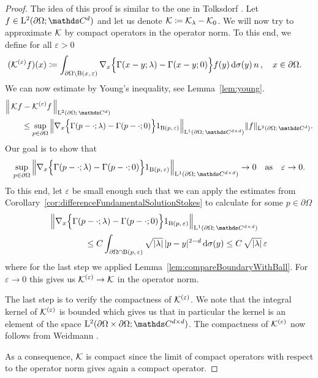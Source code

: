 \begin{proof}
  The idea of this proof is similar to the one in Tolksdorf \cite[Lem.\@~4.3.5]{tolksdorf}.
  Let $f \in \Ell^2(\partial\Omega; \C^d)$ and let us denote $\mathcal{K} \coloneqq \mathcal{K}_\lambda - \mathcal{K}_0$. 
  We will now try to approximate $\mathcal{K}$ by compact operators in the operator norm.
  To this end, we define for all $\varepsilon > 0$
  \begin{align*}
    &(\mathcal{K}^{(\varepsilon)}f)(x) 
    \coloneqq \int_{\partial\Omega \setminus \mathrm{B}(x,\,\varepsilon)} \nabla_x \Big\{ \Gamma(x - y; \lambda) - \Gamma(x - y; 0) \Big\} f(y) \, {\operatorname{d}\!{\sigma}}(y) \, n\,, \quad x \in \partial\Omega.
  \end{align*}
  We can now estimate by Young's inequality, see Lemma~\ref{lem:young}.
  \begin{align*}
    &\Big\| \,\K f - \K^{(\varepsilon)} f\, \Big\|_{\Ell^2(\partial\Omega; \,\C^d)} \\
    &\qquad\leq \sup_{p \in \partial\Omega} \Big\| \nabla_x \Big\{ \Gamma(p - \cdot; \lambda) - \Gamma(p - \cdot; 0) \Big\} 1_{\BB(p,\,\varepsilon)} \Big\|_{\Ell^1(\partial\Omega; \,\C^{d \times d})} \|f\|_{\Ell^2(\partial\Omega; \,\C^d)}.
  \end{align*}
  Our goal is to show that
  \begin{align*}
    \sup_{p \in \partial\Omega} \Big\| \nabla_x \Big\{ \Gamma(p - \cdot; \lambda) - \Gamma(p - \cdot; 0) \Big\} 1_{\BB(p,\,\varepsilon)} \Big\|_{\Ell^1(\partial\Omega; \,\C^{d \times d})} \to 0 \quad \text{as} \quad \varepsilon \to 0.
  \end{align*}
  To this end, let $\varepsilon$ be small enough such that we can apply the estimates from Corollary~\ref{cor:differenceFundamentalSolutionStokes} to calculate for some $p \in \partial\Omega$
  \begin{align*}
    &\Big\| \nabla_x \Big\{ \Gamma(p - \cdot; \lambda) - \Gamma(p - \cdot; 0) \Big\} 1_{\BB(p,\,\varepsilon)} \Big\|_{\Ell^1(\partial\Omega; \,\C^{d \times d})}  \\
     &\qquad\qquad\leq C \int_{\partial\Omega \cap \BB(p,\, \varepsilon)} \sqrt{|\lambda|}\, |p - y|^{2 - d} \d\sigma(y) 
     \leq C\, \sqrt{|\lambda|} \,\varepsilon
  \end{align*}
  where for the last step we applied Lemma~\ref{lem:compareBoundaryWithBall}.
  For $\varepsilon \to 0$ this gives us $\mathcal{K}^{(\varepsilon)} \to \mathcal{K}$ in the operator norm.

  The last step is to verify the compactness of $\mathcal{K}^{(\varepsilon)}$.
  We note that the integral kernel of $\mathcal{K}^{(\varepsilon)}$ is bounded which gives us that in particular the kernel is an element of the space $\Ell^2(\partial\Omega \times \partial\Omega; \C^{d \times d})$.
  The compactness of $\mathcal{K}^{(\varepsilon)}$ now follows from Weidmann \cite[Thm.\@~6.11]{weidmann}.

  As a consequence, $\mathcal{K}$ is compact since the limit of compact operators with respect to the operator norm gives again a compact operator.
\end{proof}

